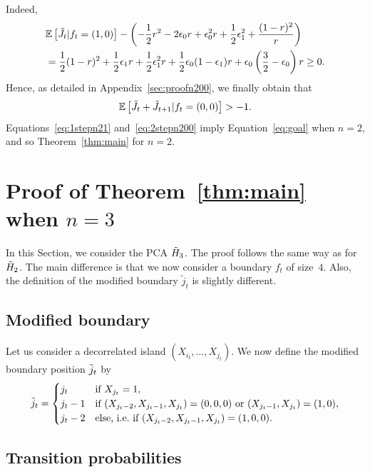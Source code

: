 \documentclass[11pt]{article}
\theoremstyle{plain}
\theoremstyle{definition}
\theoremstyle{remark}
\newcommand{\esp}[1]{\mathbb{E}\left[ #1 \right]}
\begin{document}
Indeed,
\begin{align}
& \esp{\Tilde{J}_t|f_t = (1,0)} - \left(-\frac{1}{2} r^2 - 2 \epsilon_0 r + \epsilon_0^2 r + \frac{1}{2} \epsilon_1^2 + \frac{(1-r)^2}{r} \right) \nonumber \\
& = \frac{1}{2} (1-r)^2 + \frac{1}{2} \epsilon_1 r + \frac{1}{2} \epsilon_1^2 r + \frac{1}{2} \epsilon_0 (1-\epsilon_1)r + \epsilon_0 \left(\frac{3}{2}-\epsilon_0 \right)r \geq 0. \label{eq:diff10}
\end{align}
Hence, as detailed in Appendix~\ref{sec:proofn200}, we finally obtain that
\begin{equation} \label{eq:2stepn200}
\esp{\Tilde{J}_{t}+\Tilde{J}_{t+1} | f_t=(0,0)} > -1.
\end{equation}
Equations~\eqref{eq:1stepn21} and~\eqref{eq:2stepn200} imply Equation~\eqref{eq:goal} when $n=2$, and so Theorem~\ref{thm:main} for $n=2$.

\section{Proof of Theorem~\ref{thm:main} when $n=3$}\label{sec:proof3}
In this Section, we consider the PCA $\Tilde{H}_3$. The proof follows the same way as for $\Tilde{H}_2$. The main difference is that we now consider a boundary $f_t$ of size~$4$. Also, the definition of the modified boundary $\tilde{j}_t$ is slightly different.

\subsection{Modified boundary}\label{sec:mod3}

Let us consider a decorrelated island $(X_{i_t},\dots,X_{j_t})$. We now define the modified boundary position $\Tilde{j}_t$ by
\begin{displaymath}
\Tilde{j}_{t} = \begin{cases}
    j_t & \text{if } X_{j_t}=1, \\
    j_t-1 & \text{if } (X_{j_t-2},X_{j_t-1},X_{j_t})=(0,0,0) \text{ or } (X_{j_t-1},X_{j_t}) = (1,0),\\ 
    j_t-2 & \text{else, i.e.\ if } (X_{j_t-2},X_{j_t-1},X_{j_t})=(1,0,0).
\end{cases}
\end{displaymath}

\subsection{Transition probabilities}
\end{document}
